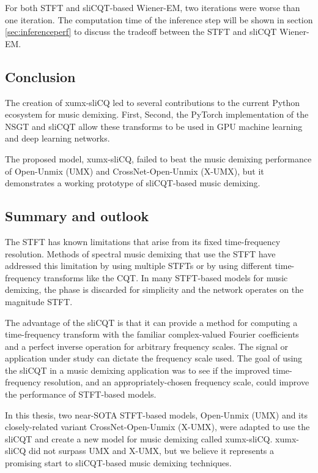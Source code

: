 \documentclass[report.tex]{subfiles}
\begin{document}
For both STFT and sliCQT-based Wiener-EM, two iterations were worse than one iteration. The computation time of the inference step will be shown in section \ref{sec:inferenceperf} to discuss the tradeoff between the STFT and sliCQT Wiener-EM.

\subsection{Conclusion}
\label{sec:conclusion}


The creation of xumx-sliCQ led to several contributions to the current Python ecosystem for music demixing. First, Second, the PyTorch implementation of the NSGT and sliCQT allow these transforms to be used in GPU machine learning and deep learning networks.

The proposed model, xumx-sliCQ, failed to beat the music demixing performance of Open-Unmix (UMX) and CrossNet-Open-Unmix (X-UMX), but it demonstrates a working prototype of sliCQT-based music demixing.

\subsection{Summary and outlook}

The STFT has known limitations that arise from its fixed time-frequency resolution. Methods of spectral music demixing that use the STFT have addressed this limitation by using multiple STFTs or by using different time-frequency transforms like the CQT. In many STFT-based models for music demixing, the phase is discarded for simplicity and the network operates on the magnitude STFT.

The advantage of the sliCQT is that it can provide a method for computing a time-frequency transform with the familiar complex-valued Fourier coefficients and a perfect inverse operation for arbitrary frequency scales. The signal or application under study can dictate the frequency scale used. The goal of using the sliCQT in a music demixing application was to see if the improved time-frequency resolution, and an appropriately-chosen frequency scale, could improve the performance of STFT-based models.

In this thesis, two near-SOTA STFT-based models, Open-Unmix (UMX) and its closely-related variant CrossNet-Open-Unmix (X-UMX), were adapted to use the sliCQT and create a new model for music demixing called xumx-sliCQ. xumx-sliCQ did not surpass UMX and X-UMX, but we believe it represents a promising start to sliCQT-based music demixing techniques.
\end{document}
